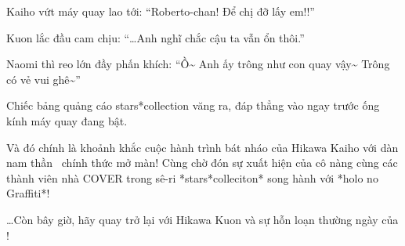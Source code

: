\documentclass[../main.tex]{subfiles}
\begin{document}
Kaiho vứt máy quay lao tới: ``Roberto-chan! Để chị đỡ lấy em!!''

Kuon lắc đầu cam chịu: ``\dots Anh nghĩ chắc cậu ta vẫn ổn thôi.''

Naomi thì reo lớn đầy phấn khích: ``Ồ\~{} Anh ấy trông như con quay vậy\~{} Trông có vẻ vui ghê\~{}''

Chiếc bảng quảng cáo stars*collection văng ra, đáp thẳng vào ngay trước ống kính máy quay đang bật.

Và đó chính là khoảnh khắc cuộc hành trình bát nháo của Hikawa Kaiho với dàn nam thần \hls\ chính thức mở màn! Cùng chờ đón sự xuất hiện của cô nàng cùng các thành viên nhà COVER trong sê-ri *stars*colleciton* song hành với *holo no Graffiti*!

\dots Còn bây giờ, hãy quay trở lại với Hikawa Kuon và sự hỗn loạn thường ngày của \hll!
\end{document}
